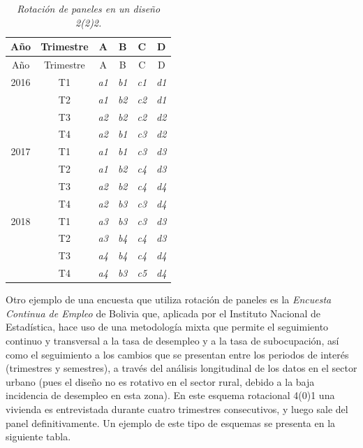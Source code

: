 \documentclass[
  12pt,
]{book}
\begin{document}
\begin{longtable}[]{@{}cccccc@{}}
\caption{\emph{Rotación de paneles en un diseño 2(2)2.}}\tabularnewline
\toprule()
Año & Trimestre & A & B & C & D \\
\midrule()
\endfirsthead
\toprule()
Año & Trimestre & A & B & C & D \\
\midrule()
\endhead
2016 & T1 & \emph{a1} & \emph{b1} & \emph{c1} & \emph{d1} \\
& T2 & \emph{a1} & \emph{b2} & \emph{c2} & \emph{d1} \\
& T3 & \emph{a2} & \emph{b2} & \emph{c2} & \emph{d2} \\
& T4 & \emph{a2} & \emph{b1} & \emph{c3} & \emph{d2} \\
2017 & T1 & \emph{a1} & \emph{b1} & \emph{c3} & \emph{d3} \\
& T2 & \emph{a1} & \emph{b2} & \emph{c4} & \emph{d3} \\
& T3 & \emph{a2} & \emph{b2} & \emph{c4} & \emph{d4} \\
& T4 & \emph{a2} & \emph{b3} & \emph{c3} & \emph{d4} \\
2018 & T1 & \emph{a3} & \emph{b3} & \emph{c3} & \emph{d3} \\
& T2 & \emph{a3} & \emph{b4} & \emph{c4} & \emph{d3} \\
& T3 & \emph{a4} & \emph{b4} & \emph{c4} & \emph{d4} \\
& T4 & \emph{a4} & \emph{b3} & \emph{c5} & \emph{d4} \\
\bottomrule()
\end{longtable}

Otro ejemplo de una encuesta que utiliza rotación de paneles es la \emph{Encuesta Continua de Empleo} de Bolivia que, aplicada por el Instituto Nacional de Estadística, hace uso de una metodología mixta que permite el seguimiento continuo y transversal a la tasa de desempleo y a la tasa de subocupación, así como el seguimiento a los cambios que se presentan entre los periodos de interés (trimestres y semestres), a través del análisis longitudinal de los datos en el sector urbano (pues el diseño no es rotativo en el sector rural, debido a la baja incidencia de desempleo en esta zona). En este esquema rotacional 4(0)1 una vivienda es entrevistada durante cuatro trimestres consecutivos, y luego sale del panel definitivamente. Un ejemplo de este tipo de esquemas se presenta en la siguiente tabla.
\end{document}
